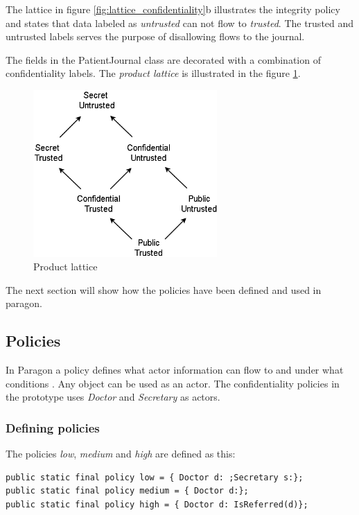 The lattice in figure \ref{fig:lattice_confidentiality}b illustrates the integrity policy and states that data labeled as \emph{untrusted} can not flow to \emph{trusted}. The trusted and untrusted labels serves the purpose of disallowing flows to the journal.

The fields in the PatientJournal class are decorated with a combination of confidentiality labels. The \emph{product lattice} is illustrated in the figure \ref{fig:lattice_product}.

\begin{figure}[H] 
	\centering
	\includegraphics[width=7cm]{figures/lattice_product.png}
	\caption{Product lattice}
	\label{fig:lattice_product}
\end{figure}


The next section will show how the policies have been defined and used in paragon. 



\subsection{Policies}\label{policies} 

In Paragon a policy defines what actor information can flow to and under what conditions 
\cite{paragonprogramming}. Any object can be used as an actor. The confidentiality policies in the prototype uses \emph{Doctor} and \emph{Secretary} as actors. 


\subsubsection{Defining policies}\label{policydef}
The policies \emph{low}, \emph{medium} and \emph{high} are defined as this:

\begin{lstlisting}
public static final policy low = { Doctor d: ;Secretary s:};
public static final policy medium = { Doctor d:};
public static final policy high = { Doctor d: IsReferred(d)};
\end{lstlisting}


